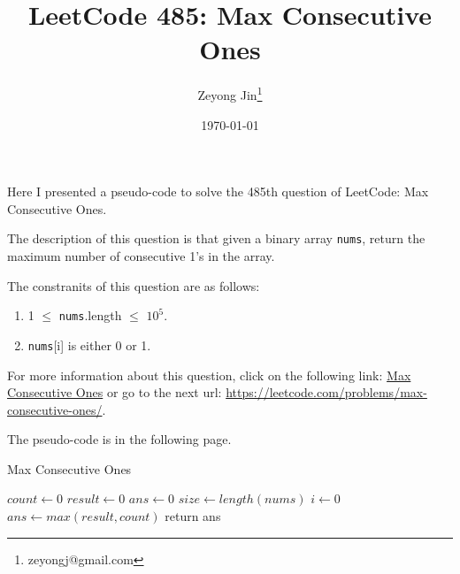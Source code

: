 \documentclass{article}
\title{LeetCode 485: Max Consecutive Ones}
\author{Zeyong Jin\thanks{zeyongj@gmail.com}}
\affil{School of Computing Sciences, Simon Fraser University}
\date{\today}
\begin{document}
\maketitle

Here I presented a pseudo-code to solve the 485th question of LeetCode: Max Consecutive Ones.

The description of this question is that given a binary array \texttt{nums}, return the maximum number of consecutive 1's in the array.

The constranits of this question are as follows:
\begin{enumerate}[label=(\alph*),leftmargin=2\parindent]
   \item 1 $\leq$ \texttt{nums}.length $\leq$ $10^{5}$.
   \item \texttt{nums}[i] is either 0 or 1.
\end{enumerate}


For more information about this question, click on the following link: 
    \href{https://leetcode.com/problems/max-consecutive-ones/}{Max Consecutive Ones} or go to the next url: \url{https://leetcode.com/problems/max-consecutive-ones/}.

The pseudo-code is in the following page.

{}

\begin{algorithm}[hbt!]
\caption{Max Consecutive Ones}\label{alg:two}
\LinesNumbered
{}
$count \gets 0$\;
$result \gets 0$\;
$ans \gets 0$\;
$size \gets length(nums)$\;
  {
  $i \gets 0$\;
$ans \gets max(result, count)$\;
return ans\;
  }

\end{algorithm}
\end{document}
